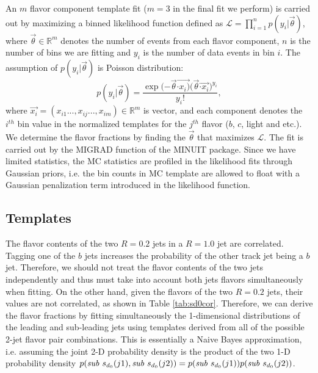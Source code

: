 An $m$ flavor component template fit ($m = 3$ in the final fit we perform) is carried out by maximizing a binned likelihood function defined as $\mathcal{L} = \prod _{i=1} ^n p(y_i| \vec{\theta})$, where $\vec{\theta} \in \mathbb{R}^m$ denotes the number of events from each flavor component, $n$ is the number of bins we are fitting and $y_i$ is the number of data events in bin $i$. The assumption of $p(y_i|\vec{\theta})$ is Poisson distribution: 
\begin{equation}
p(y_i|\vec{\theta}) = \frac{\exp{(-\vec{\theta} \vec{\cdot x_i)}} {(\vec{\theta}} \vec{\cdot x_i})^{y_i}}{y_i !}, 
\end{equation}
where $\vec{x_i}=(x_{i1}...,x_{ij}...,x_{im}) \in \mathbb{R}^m$ is vector, and each component denotes the $i^{th}$ bin value in the normalized templates for the $j^{th}$ flavor ($b$, $c$, light and etc.).   We determine the flavor fractions by finding the $\vec{\theta}$ that maximizes $\mathcal{L}$. The fit is carried out by the MIGRAD function of the MINUIT package. Since we have limited statistics, the MC statistics are profiled in the likelihood fits through Gaussian priors, i.e. the bin counts in MC template are allowed to float with a Gaussian penalization term introduced in the likelihood function.


\subsection{\subsdzero Templates }

The flavor contents of the two $R=0.2$ jets in a $R=1.0$ jet are correlated. 
Tagging one of the $b$ jets increases the probability of the other track jet 
being a $b$ jet. Therefore, we should not treat the flavor 
contents of the two jets independently and thus must take into account both jets 
flavors simultaneously when fitting. On the other hand, given the flavors of the 
two $R= 0.2$ jets, their \subsdzero values are not correlated, as shown in Table \ref{tab:sd0cor}. 
Therefore, we can derive the flavor fractions by fitting simultaneously the 
1-dimensional \subsdzero distributions of the leading and sub-leading jets
 using templates derived from all of the possible 2-jet flavor pair 
combinations. This is essentially a Naive Bayes approximation, i.e. assuming the joint 
2-D probability density is the product of the two 1-D probability density
 $p(\textit{sub } s_{d_0}(j1), \textit{sub } s_{d_0}(j2)) = p(\textit{sub } s_{d_0}(j1))p(\textit{sub } s_{d_0}(j2))$.

